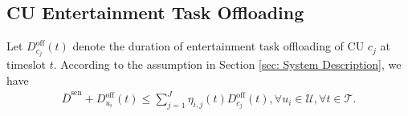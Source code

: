 \documentclass[10pt,journal,compsoc]{IEEEtran}
\begin{document}

\subsection{CU Entertainment Task Offloading}
Let $D_{c_{j}}^{\text{off}}(t)$ denote the duration of entertainment task offloading of CU $c_{j}$ at timeslot $t$. According to the assumption in Section \ref{sec: System Description}, we have 
\begin{align}\label{P0:Task-Fresh}
    \bar{D}^{\text{sen}} + D_{u_{i}}^{\text{off}}(t) \le \sum_{j = 1}^{J} \eta_{i, j}(t) D_{c_{j}}^{\text{off}}(t), \forall u_{i} \in \mathcal{U}, \forall t \in \mathcal{T}.
\end{align}
\end{document}
